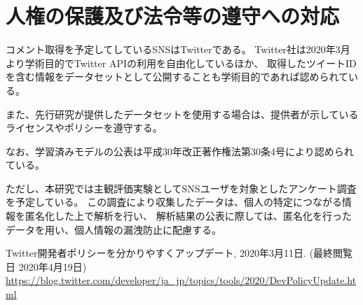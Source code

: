 
\section{人権の保護及び法令等の遵守への対応}

コメント取得を予定してしているSNSはTwitterである。
Twitter社は2020年3月より学術目的でTwitter APIの利用を自由化しているほか、
取得したツイートIDを含む情報をデータセットとして公開することも学術目的であれば認められている\cite{twitter_2020}。

また、先行研究が提供したデータセットを使用する場合は、提供者が示しているライセンスやポリシーを遵守する。

なお、学習済みモデルの公表は平成30年改正著作権法第30条4号により認められている。

ただし、本研究では主観評価実験としてSNSユーザを対象としたアンケート調査を予定している。
この調査により収集したデータは、個⼈の特定につながる情報を匿名化した上で解析を⾏い、
解析結果の公表に際しては、匿名化を⾏ったデータを⽤い、個⼈情報の漏洩防⽌に配慮する。

\vspace{1cm}
{\footnotesize
	\begin{thebibliography}{99}
		\setcounter{enumiv}{11}
		 Twitter開発者ポリシーを分かりやすくアップデート, 2020年3月11日. (最終閲覧日 2020年4月19日) \url{https://blog.twitter.com/developer/ja_jp/topics/tools/2020/DevPolicyUpdate.html}
	\end{thebibliography}
}



